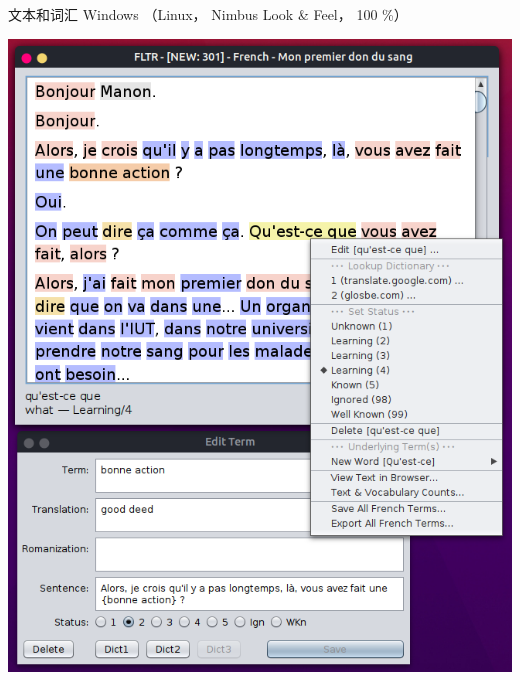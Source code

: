 \documentclass[cn,10pt,math=newtx,citestyle=gb7714-2015,bibstyle=gb7714-2015]{elegantbook}
\begin{document}
文本和词汇 Windows （Linux， Nimbus Look \& Feel， 100 \%）

\includegraphics[scale=0.5]{image/images-014.png}
\end{document}
